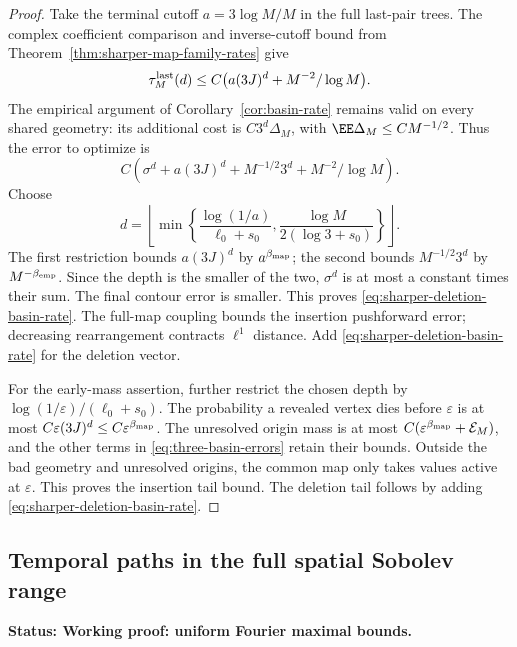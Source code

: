\documentclass[11pt,letterpaper]{article}
\newcommand{\status}[1]{\textbf{Status: #1.}}
\begin{document}
\begin{proof}
Take the terminal cutoff $a=3\log M/M$ in the full last-pair
trees. The complex coefficient comparison and inverse-cutoff
bound from Theorem~\ref{thm:sharper-map-family-rates} give
\[
 \tau_M^{\rm last}(d)
       \le C\bigl(a(3J)^d+M^{-2}/\log M\bigr).
\]
The empirical argument of Corollary~\ref{cor:basin-rate} remains
valid on every shared geometry: its additional cost is
$C3^d\Delta_M$, with $\EE\Delta_M\le C M^{-1/2}$.
Thus the error to optimize is
\begin{equation}\label{eq:three-basin-errors}
 C\left(\sigma^d+a(3J)^d+M^{-1/2}3^d
                                      +M^{-2}/\log M\right).
\end{equation}
Choose
\[
 d=\left\lfloor\min\left\{
      \frac{\log(1/a)}{\ell_0+s_0},
      \frac{\log M}{2(\log3+s_0)}\right\}\right\rfloor.
\]
The first restriction bounds $a(3J)^d$ by
$a^{\beta_{\rm map}}$; the second bounds $M^{-1/2}3^d$ by
$M^{-\beta_{\rm emp}}$. Since the depth is the smaller of the
two, $\sigma^d$ is at most a constant times their sum.
The final contour error is smaller. This proves
\eqref{eq:sharper-deletion-basin-rate}.
The full-map coupling bounds the insertion pushforward error;
decreasing rearrangement contracts $\ell^1$ distance. Add
\eqref{eq:sharper-deletion-basin-rate} for the deletion vector.

For the early-mass assertion, further restrict the chosen depth
by $\log(1/\varepsilon)/(\ell_0+s_0)$.
The probability a revealed vertex dies before $\varepsilon$ is
at most $C\varepsilon(3J)^d\le C\varepsilon^{\beta_{\rm map}}$.
The unresolved origin mass is at most
$C(\varepsilon^{\beta_{\rm map}}+\mathcal E_M)$, and the other
terms in \eqref{eq:three-basin-errors} retain their bounds.
Outside the bad geometry and unresolved origins, the common
map only takes values active at $\varepsilon$. This proves the
insertion tail bound. The deletion tail follows by adding
\eqref{eq:sharper-deletion-basin-rate}.
\end{proof}

\subsection{Temporal paths in the full spatial Sobolev range}
\label{sec:full-sobolev-paths}

\status{Working proof: uniform Fourier maximal bounds}
\end{document}

